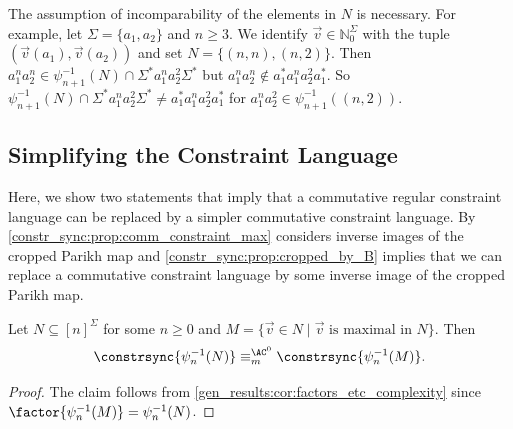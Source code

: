 \begin{example} \label{constrsync:ex:incomparable}
 The assumption of incomparability of the elements in $N$
 is necessary.
 For example, let $\Sigma = \{a_1, a_2\}$ and $n \ge 3$.
 We identify $\vec{v} \in \mathbb N_0^{\Sigma}$
 with the tuple $(\vec{v}(a_1), \vec{v}(a_2))$ 
 and set $N = \{ (n,n), (n,2) \}$.
 Then 
  $a_1^n a_2^n \in \psi_{n+1}^{-1}(N) \cap \Sigma^* a_1^n a_2^2 \Sigma^*$
  but $a_1^n a_2^n \notin a_1^* a_1^n a_2^2 a_1^*$.
 So $ \psi_{n+1}^{-1}(N) \cap \Sigma^* a_1^n a_2^2 \Sigma^* \ne a_1^* a_1^n a_2^2 a_1^*$
 for $a_1^n a_2^2 \in \psi_{n+1} ^{-1}( (n, 2) )$. 
\end{example}

\subsection{Simplifying the Constraint Language}
\label{constrsync:sec:comm:simplifying}

Here, we show two statements that imply
that a commutative regular constraint language
can be replaced by a simpler commutative constraint language.
By \cref{constr_sync:prop:comm_constraint_max}
considers inverse images of the cropped Parikh 
map and \cref{constr_sync:prop:cropped_by_B} 
implies that we can replace a commutative
constraint language by some inverse image
of the cropped Parikh map.

\begin{proposition} 
	\label{constr_sync:prop:comm_constraint_max}
    Let $N \subseteq [n]^{\Sigma}$ for some $n \ge 0$
    and $M = \{ \vec{v} \in N \mid \text{$\vec{v}$ is maximal in~$N$} \}$.
    Then
	\[
	\constrsync{\psi_{n}^{-1}(N)} 
	\equiv_m^{\AC^0} 
	\constrsync{\psi_{n}^{-1}(M)}.
	\]
\end{proposition}
\begin{proof}
	The claim follows from 
	\cref{gen_results:cor:factors_etc_complexity}
	since $\factor{\psi_{n}^{-1}(M)}
	= \psi_{n}^{-1}(N)$.
\end{proof}

